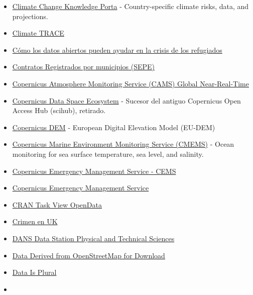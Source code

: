 \documentclass[
  letterpaper,
  DIV=11,
  numbers=noendperiod]{scrartcl}
\begin{document}
\begin{itemize}
\item
  \href{https://climateknowledgeportal.worldbank.org/}{Climate Change
  Knowledge Porta} - Country-specific climate risks, data, and
  projections.
\item
  \href{https://climatetrace.org/data}{Climate TRACE}
\item
  \href{https://datos.gob.es/es/blog/como-los-datos-abiertos-pueden-ayudar-en-la-crisis-de-los-refugiados?utm_source=newsletter&utm_medium=email&utm_campaign=Datos-en-tiempo-real-open-access-y-mucho-ms-en-datosgobes}{Cómo
  los datos abiertos pueden ayudar en la crisis de los refugiados}
\item
  \href{https://datos.gob.es/es/catalogo/ea0041513-contratos-registrados-por-municipio}{Contratos
  Registrados por municipios (SEPE)}
\item
  \href{https://developers.google.com/earth-engine/datasets/catalog/ECMWF_CAMS_NRT}{Copernicus
  Atmosphere Monitoring Service (CAMS) Global Near-Real-Time}
\item
  \href{https://dataspace.copernicus.eu/}{Copernicus Data Space
  Ecosystem} - Sucesor del antiguo Copernicus Open Access Hub (scihub),
  retirado.
\item
  \href{https://spacedata.copernicus.eu/collections/copernicus-digital-elevation-model}{Copernicus
  DEM} - European Digital Elevation Model (EU-DEM)
\item
  \href{https://marine.copernicus.eu/}{Copernicus Marine Environment
  Monitoring Service (CMEMS)} - Ocean monitoring for sea surface
  temperature, sea level, and salinity.
\item
  \href{https://confluence.ecmwf.int/display/CEMS/Copernicus+Emergency+Management+Service+-+CEMS+Home}{Copernicus
  Emergency Management Service - CEMS}
\item
  \href{https://emergency.copernicus.eu/}{Copernicus Emergency
  Management Service}
\item
  \href{https://github.com/ropensci/opendata}{CRAN Task View OpenData}
\item
  \href{https://data.police.uk/}{Crimen en UK}
\item
  \href{https://phys-techsciences.datastations.nl/}{DANS Data Station
  Physical and Technical Sciences}
\item
  \href{https://osmdata.openstreetmap.de/}{Data Derived from
  OpenStreetMap for Download}
\item
  \href{https://www.data-is-plural.com/}{Data Is Plural}
\item

\end{itemize}
\end{document}
